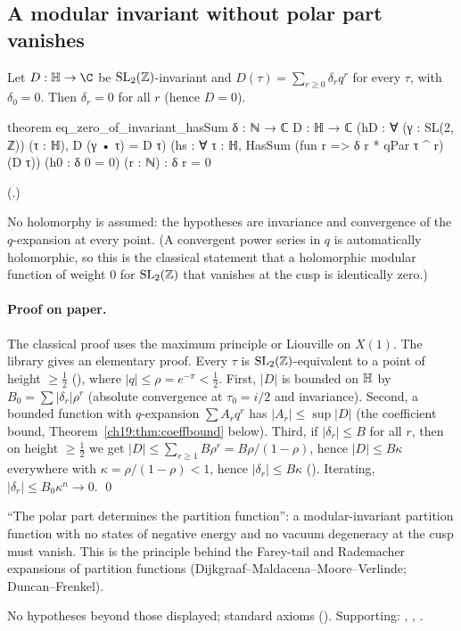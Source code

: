 \subsection{A modular invariant without polar part vanishes}

\begin{theorem}\label{ch19:thm:vanish}
Let $D:\chnineteenH\to\C$ be $\mathrm{SL}_2(\mathbb{Z})$-invariant and $D(\tau)=\sum_{r\ge0}\delta_rq^r$ for every $\tau$, with
$\delta_0=0$.  Then $\delta_r=0$ for all $r$ (hence $D=0$).
\end{theorem}
\begin{leancode}
theorem eq_zero_of_invariant_hasSum {δ : ℕ → ℂ} {D : ℍ → ℂ}
    (hD : ∀ (γ : SL(2, ℤ)) (τ : ℍ), D (γ • τ) = D τ)
    (hs : ∀ τ : ℍ, HasSum (fun r => δ r * qPar τ ^ r) (D τ)) (h0 : δ 0 = 0) (r : ℕ) :
    δ r = 0
\end{leancode}
(.)
\begin{dictionary}
No holomorphy is assumed: the hypotheses are invariance and convergence of the $q$-expansion at every point.  (A
convergent power series in $q$ is automatically holomorphic, so this is the classical statement that a holomorphic
modular function of weight $0$ for $\mathrm{SL}_2(\mathbb{Z})$ that vanishes at the cusp is identically zero.)
\end{dictionary}
\paragraph{Proof on paper.}  The classical proof uses the maximum principle or Liouville on $X(1)$.  The library gives an
elementary proof.  Every $\tau$ is $\mathrm{SL}_2(\mathbb{Z})$-equivalent to a point of height $\ge\frac12$
(), where $|q|\le\rho=e^{-\pi}<\frac12$.  First, $|D|$ is bounded on $\mathbb{H}$ by
$B_0=\sum|\delta_r|\rho^r$ (absolute convergence at $\tau_0=i/2$ and invariance).  Second, a bounded function with
$q$-expansion $\sum A_rq^r$ has $|A_r|\le\sup|D|$ (the coefficient bound, Theorem~\ref{ch19:thm:coeffbound} below).  Third,
if $|\delta_r|\le B$ for all $r$, then on height $\ge\frac12$ we get $|D|\le\sum_{r\ge1}B\rho^r=B\rho/(1-\rho)$, hence
$|D|\le B\kappa$ everywhere with $\kappa=\rho/(1-\rho)<1$, hence $|\delta_r|\le B\kappa$ ().
Iterating, $|\delta_r|\le B_0\kappa^n\to0$. \qed
\begin{physics}
``The polar part determines the partition function'': a modular-invariant partition function with no states of negative
energy and no vacuum degeneracy at the cusp must vanish.  This is the principle behind the Farey-tail and Rademacher
expansions of partition functions (Dijkgraaf--Maldacena--Moore--Verlinde; Duncan--Frenkel).
\end{physics}
\begin{status}
No hypotheses beyond those displayed; standard axioms ().  Supporting:
, , .
\end{status}

